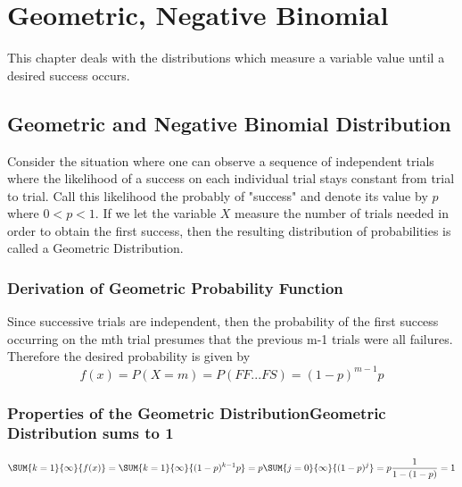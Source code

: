 \documentclass[10pt,]{book}
\theoremstyle{plain}
\theoremstyle{definition}
\theoremstyle{definition}
\numberwithin{equation}{section}
\newcommand{\lt}{ < }
\begin{document}
\chapter[Geometric, Negative Binomial]{Geometric, Negative Binomial}\label{DesiredSuccessDistributions}
\typeout{************************************************}
\typeout{************************************************}
This chapter deals with the distributions which measure a variable value until a desired success occurs.%
\typeout{************************************************}
\typeout{************************************************}
\section[Geometric and Negative Binomial Distribution]{Geometric and Negative Binomial Distribution}\label{GeometricDistribution}
Consider the situation where one can observe a sequence  of independent trials where the likelihood of a success on each individual trial
		stays constant from trial to trial. Call this likelihood the probably of "success" and denote its value by \(p\) 
		where \( 0 \lt p \lt 1 \).  
		If we let the variable \(X\) measure the number of trials needed in order to obtain the first success, 
		then the resulting distribution of probabilities is called a Geometric Distribution.%
\typeout{************************************************}
\typeout{************************************************}
\subsection[Derivation of Geometric Probability Function]{Derivation of Geometric Probability Function}\label{subsection-15}
 Since successive trials are independent, then the probability of the first success occurring on the mth trial presumes that
				the previous m-1 trials were all failures.  Therefore the desired probability is given by %
\begin{equation*}f(x) = P(X=m) = P(FF...FS) = (1-p)^{m-1}p\end{equation*}\typeout{************************************************}
\typeout{************************************************}
\subsection[Properties of the Geometric DistributionGeometric Distribution sums to 1]{Properties of the Geometric DistributionGeometric Distribution sums to 1}\label{subsection-16}
\begin{gather*}
\SUM {k=1} {\infty} {f(x)} = \SUM {k=1} {\infty} {(1-p)^{k-1} p} = p \SUM {j=0} {\infty} {(1-p)^j} = p \frac{1}{1-(1-p)} = 1
\end{gather*}\typeout{************************************************}
\typeout{************************************************}
\end{document}
